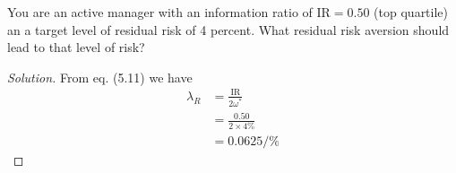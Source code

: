 \begin{problem}{5.6}
 You are an active manager with an information ratio of $\mathrm{IR}=0.50$ (top quartile) an a target level of residual risk of 4 percent. What residual risk aversion should lead to that level of risk?
\end{problem}

\begin{proof}[Solution]
 From eq. (5.11) we have
 \begin{align*}
  \lambda_{R}&=\frac{\mathrm{IR}}{2\omega^{*}}\\
	     &=\frac{0.50}{2\times 4\%}\\
	     &=0.0625/\%
 \end{align*}

\end{proof}



